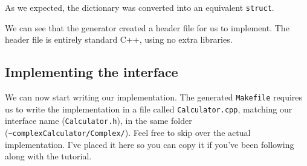 As we expected, the dictionary was converted into an equivalent
\texttt{struct}.

\begin{Shaded}
\begin{Highlighting}[]
 
\end{Highlighting}
\end{Shaded}

\begin{Shaded}
\begin{Highlighting}[]
 
 






\NormalTok{\}}
\NormalTok{\}}
\end{Highlighting}
\end{Shaded}

We can see that the generator created a header file for us to implement.
The header file is entirely standard C++, using no extra libraries.

\subsection{Implementing the
interface}\label{implementing-the-interface}

We can now start writing our implementation. The generated
\texttt{Makefile} requires us to write the implementation in a file
called \texttt{Calculator.cpp}, matching our interface name
(\texttt{Calculator.h}), in the same folder
(\texttt{\textasciitilde{}complexCalculator/Complex/}). Feel free to
skip over the actual implementation. I've placed it here so you can copy
it if you've been following along with the tutorial.

\begin{Shaded}
\begin{Highlighting}[]
 
\end{Highlighting}
\end{Shaded}

